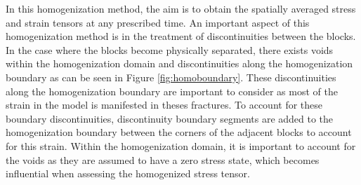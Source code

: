 In this homogenization method, the aim is to obtain the spatially averaged stress and strain tensors at any prescribed time. An important aspect of this homogenization method is in the treatment of discontinuities between the blocks. In the case where the blocks become physically separated, there exists voids within the homogenization domain and discontinuities along the homogenization boundary as can be seen in Figure \ref{fig:homoboundary}. These discontinuities along the homogenization boundary are important to consider as most of the strain in the model is manifested in theses fractures. To account for these boundary discontinuities, discontinuity boundary segments are added to the homogenization boundary between the corners of the adjacent blocks to account for this strain. Within the homogenization domain, it is important to account for the voids as they are assumed to have a zero stress state, which becomes influential when assessing the homogenized stress tensor.

